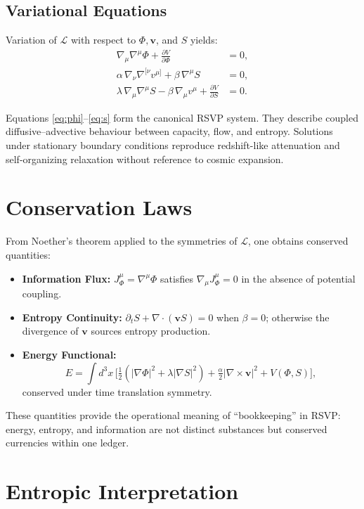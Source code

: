 \documentclass[12pt]{article}
\begin{document}
\subsection{Variational Equations}

Variation of $\mathcal{L}$ with respect to $\Phi, \mathbf{v}$, and $S$ yields:
\begin{align}
\nabla_\mu\nabla^\mu \Phi + \frac{\partial V}{\partial \Phi} &= 0, \label{eq:phi}\\[3pt]
\alpha\,\nabla_\nu \nabla^{[\nu} v^{\mu]} + \beta\,\nabla^\mu S &= 0, \label{eq:v}\\[3pt]
\lambda\,\nabla_\mu\nabla^\mu S - \beta\,\nabla_\mu v^\mu + \frac{\partial V}{\partial S} &= 0. \label{eq:s}
\end{align}

Equations \eqref{eq:phi}--\eqref{eq:s} form the canonical RSVP system.  
They describe coupled diffusive--advective behaviour between capacity, flow, and entropy.
Solutions under stationary boundary conditions reproduce redshift-like attenuation and self-organizing relaxation without reference to cosmic expansion.

\section{Conservation Laws}

From Noether's theorem applied to the symmetries of $\mathcal{L}$, one obtains conserved quantities:
\begin{itemize}
\item \textbf{Information Flux:} $J_\Phi^\mu = \nabla^\mu \Phi$ satisfies $\nabla_\mu J_\Phi^\mu = 0$ in the absence of potential coupling.
\item \textbf{Entropy Continuity:} $\partial_t S + \nabla\!\cdot(\mathbf{v} S) = 0$ when $\beta=0$; otherwise the divergence of $\mathbf{v}$ sources entropy production.
\item \textbf{Energy Functional:} 
\[
E = \int d^3x\, \big[\tfrac{1}{2}(|\nabla \Phi|^2 + \lambda |\nabla S|^2) + \tfrac{\alpha}{2}|\nabla\times\mathbf{v}|^2 + V(\Phi,S)\big],
\]
conserved under time translation symmetry.
\end{itemize}

These quantities provide the operational meaning of “bookkeeping” in RSVP: energy, entropy, and information are not distinct substances but conserved currencies within one ledger.

\section{Entropic Interpretation}
\end{document}
